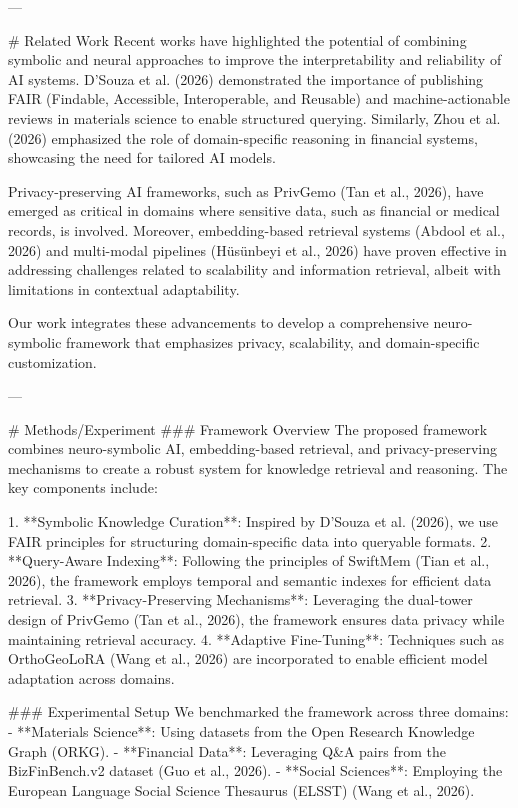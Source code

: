 ---

# Related Work  
Recent works have highlighted the potential of combining symbolic and neural approaches to improve the interpretability and reliability of AI systems. D’Souza et al. (2026) demonstrated the importance of publishing FAIR (Findable, Accessible, Interoperable, and Reusable) and machine-actionable reviews in materials science to enable structured querying. Similarly, Zhou et al. (2026) emphasized the role of domain-specific reasoning in financial systems, showcasing the need for tailored AI models.

Privacy-preserving AI frameworks, such as PrivGemo (Tan et al., 2026), have emerged as critical in domains where sensitive data, such as financial or medical records, is involved. Moreover, embedding-based retrieval systems (Abdool et al., 2026) and multi-modal pipelines (Hüsünbeyi et al., 2026) have proven effective in addressing challenges related to scalability and information retrieval, albeit with limitations in contextual adaptability.

Our work integrates these advancements to develop a comprehensive neuro-symbolic framework that emphasizes privacy, scalability, and domain-specific customization.

---

# Methods/Experiment  
### Framework Overview  
The proposed framework combines neuro-symbolic AI, embedding-based retrieval, and privacy-preserving mechanisms to create a robust system for knowledge retrieval and reasoning. The key components include:

1. **Symbolic Knowledge Curation**: Inspired by D’Souza et al. (2026), we use FAIR principles for structuring domain-specific data into queryable formats.
2. **Query-Aware Indexing**: Following the principles of SwiftMem (Tian et al., 2026), the framework employs temporal and semantic indexes for efficient data retrieval.
3. **Privacy-Preserving Mechanisms**: Leveraging the dual-tower design of PrivGemo (Tan et al., 2026), the framework ensures data privacy while maintaining retrieval accuracy.
4. **Adaptive Fine-Tuning**: Techniques such as OrthoGeoLoRA (Wang et al., 2026) are incorporated to enable efficient model adaptation across domains.

### Experimental Setup  
We benchmarked the framework across three domains:
- **Materials Science**: Using datasets from the Open Research Knowledge Graph (ORKG).
- **Financial Data**: Leveraging Q&A pairs from the BizFinBench.v2 dataset (Guo et al., 2026).
- **Social Sciences**: Employing the European Language Social Science Thesaurus (ELSST) (Wang et al., 2026).

